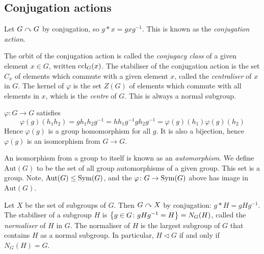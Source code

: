 \subsection{Conjugation actions}
\begin{example}
	Let \( G \curvearrowright G \) by conjugation, so \( g \ast x = g x g^{-1} \).
	This is known as the \textit{conjugation action}.
\end{example}
\begin{definition}
	The orbit of the conjugation action is called the \textit{conjugacy class} of a given element \( x \in G \), written \( \operatorname{ccl}_G(x) \).
	The stabiliser of the conjugation action is the set \( C_x \) of elements which commute with a given element \( x \), called the \textit{centraliser} of \( x \) in \( G \).
	The kernel of \( \varphi \) is the set \( Z(G) \) of elements which commute with all elements in \( x \), which is the \textit{centre} of \( G \).
	This is always a normal subgroup.
\end{definition}
\begin{remark}
	\( \varphi \colon G \to G \) satisfies
	\[
		\varphi(g)(h_1 h_2) = g h_1 h_2 g^{-1} = h h_1 g^{-1} g h_2 g^{-1} = \varphi(g)(h_1) \varphi(g)(h_2)
	\]
	Hence \( \varphi(g) \) is a group homomorphism for all \( g \).
	It is also a bijection, hence \( \varphi(g) \) is an isomorphism from \( G \to G \).
\end{remark}
\begin{definition}
	An isomorphism from a group to itself is known as an \textit{automorphism}.
	We define \( \mathrm{Aut}(G) \) to be the set of all group automorphisms of a given group.
	This set is a group.
	Note, \( \mathrm{Aut}(G) \leq \operatorname{Sym}(G) \), and the \( \varphi \colon G \to \operatorname{Sym}(G) \) above has image in \( \mathrm{Aut}(G) \).
\end{definition}
\begin{example}
	Let \( X \) be the set of subgroups of \( G \).
	Then \( G \curvearrowright X \) by conjugation: \( g \ast H = g H g^{-1} \).
	The stabiliser of a subgroup \( H \) is \( \qty{ g \in G \colon gHg^{-1} = H } = N_G(H) \), called the \textit{normaliser} of \( H \) in \( G \).
	The normaliser of \( H \) is the largest subgroup of \( G \) that contains \( H \) as a normal subgroup.
	In particular, \( H \vartriangleleft G \) if and only if \( N_G(H) = G \).
\end{example}
